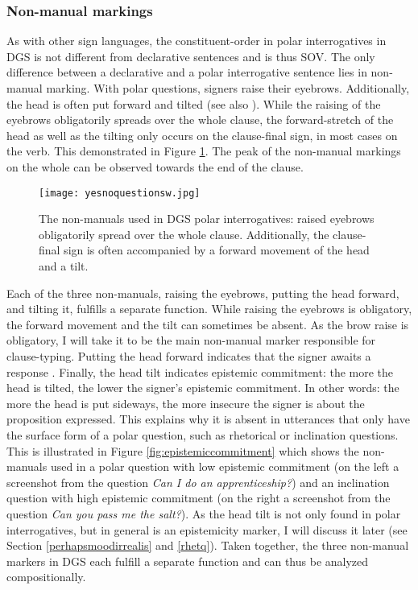 \subsubsection{Non-manual markings}
As with other sign languages, the constituent-order in polar interrogatives in DGS is not different from declarative sentences and is thus SOV. The only difference between a declarative and a polar interrogative sentence lies in non-manual marking. With polar questions, signers raise their eyebrows. Additionally, the head is often put forward and tilted (see also \citealt[171--172]{papaspyrou2008grammatik}). While the raising of the eyebrows obligatorily spreads over the whole clause, the forward-stretch of the head as well as the tilting only occurs on the clause-final sign, in most cases on the verb. This demonstrated in Figure \ref{fig:polarint}. The peak of the non-manual markings on the whole can be observed towards the end of the clause.

\begin{figure}[bt]
\centering
	\texttt{[image: yesnoquestionsw.jpg]}
	\caption{The non-manuals used in DGS polar interrogatives: raised eyebrows obligatorily spread over the whole clause. Additionally, the clause-final sign is often accompanied by a forward movement of the head and a tilt.}
	\label{fig:polarint}
\end{figure}

Each of the three non-manuals, raising the eyebrows, putting the head forward, and tilting it, fulfills a separate function. While raising the eyebrows is obligatory, the forward movement and the tilt can sometimes be absent. As the brow raise is obligatory, I will take it to be the main non-manual marker responsible for clause-typing. Putting the head forward indicates that the signer awaits a response \citep[171--172]{papaspyrou2008grammatik}. Finally, the head tilt indicates epistemic commitment: the more the head is tilted, the lower the signer's epistemic commitment. In other words: the more the head is put sideways, the more insecure the signer is about the proposition expressed. This explains why it is absent in utterances that only have the surface form of a polar question, such as rhetorical or inclination questions. This is illustrated in Figure \ref{fig:epistemiccommitment} which shows the non-manuals used in a polar question with low epistemic commitment (on the left a screenshot from the question \textit{Can I do an apprenticeship?}) and an inclination question with high epistemic commitment (on the right a screenshot from the question \textit{Can you pass me the salt?}). As the head tilt is not only found in polar interrogatives, but in general is an epistemicity marker, I will discuss it later (see Section \ref{perhapsmoodirrealis} and \ref{rhetq}). Taken together, the three non-manual markers in DGS each fulfill a separate function and can thus be analyzed compositionally.

